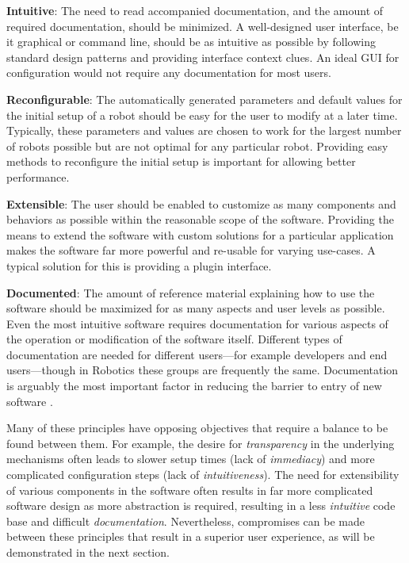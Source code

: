 \documentclass[10pt,journal,compsoc]{joser1}
\begin{document}
{{\bf Intuitive}: The need to read accompanied documentation, and the amount of required documentation, should be minimized. A well-designed user interface, be it graphical or command line, should be as intuitive as possible by following standard design patterns and providing interface context clues. An ideal GUI for configuration would not require any documentation for most users.

{\bf Reconfigurable}: The automatically generated parameters and default values for the initial setup of a robot should be easy for the user to modify at a later time. Typically, these parameters and values are chosen to work for the largest number of robots possible but are not optimal for any particular robot. Providing easy methods to reconfigure the initial setup is important for allowing better performance. 

{\bf Extensible}: The user should be enabled to customize as many components and behaviors as possible within the reasonable scope of the software. Providing the means to extend the software with custom solutions for a particular application makes the software far more powerful and re-usable for varying use-cases. A typical solution for this is providing a plugin interface.

{\bf Documented}: The amount of reference material explaining how to use the software should be maximized for as many aspects and user levels as possible. Even the most intuitive software requires documentation for various aspects of the operation or modification of the software itself. Different types of documentation are needed for different users---for example developers and end users---though in Robotics these groups are frequently the same. Documentation is arguably the most important factor in reducing the barrier to entry of new software \cite{forward2002relevance}.

Many of these principles have opposing objectives that require a balance to be found between them. For example, the desire for \textit{transparency} in the underlying mechanisms often leads to slower setup times (lack of \textit{immediacy}) and more complicated configuration steps (lack of \textit{intuitiveness}). The need for extensibility of various components in the software often results in far more complicated software design as more abstraction is required, resulting in a less \textit{intuitive} code base and difficult \textit{documentation}. Nevertheless, compromises can be made between these principles that result in a superior user experience, as will be demonstrated in the next section.

}
\end{document}
